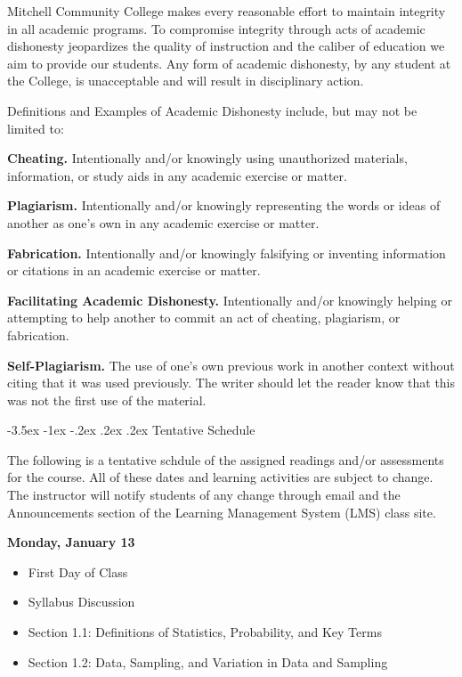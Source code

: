 \documentclass[11pt]{article}
\makeatletter
\renewcommand\section{\@startsection{section}{1}{0pt}%
  {-3.5ex \@plus -1ex \@minus -.2ex}%
  {.2ex \@plus.2ex}%
  {\normalfont\Large\bfseries}} %
\makeatother
\begin{document}
Mitchell Community College makes every reasonable effort to maintain integrity in all academic programs. To compromise integrity through acts of academic dishonesty jeopardizes the quality of instruction and the caliber of education we aim to provide our students.  Any form of academic dishonesty, by any student at the College, is unacceptable and will result in disciplinary action.

Definitions and Examples of Academic Dishonesty include, but may not be limited to:

\textbf{Cheating.} Intentionally and/or knowingly using unauthorized materials, information, or study aids in any academic exercise or matter.

\textbf{Plagiarism.} Intentionally and/or knowingly representing the words or ideas of another as one's own in any academic exercise or matter.

\textbf{Fabrication.} Intentionally and/or knowingly falsifying or inventing information or citations in an academic exercise or matter.

\textbf{Facilitating Academic Dishonesty.} Intentionally and/or knowingly helping or attempting to help another to commit an act of cheating, plagiarism, or fabrication.

\textbf{Self-Plagiarism.} The use of one's own previous work in another context without citing that it was used previously. The writer should let the reader know that this was not the first use of the material.

\pagebreak
\section{Tentative Schedule}

The following is a tentative schdule of the assigned readings and/or assessments for the course. All of these dates and learning activities are subject to change. The instructor will notify students of any change through email and the Announcements section of the Learning Management System (LMS) class site.

\textbf{Monday, January 13}

\begin{itemize}
\item First Day of Class
\item Syllabus Discussion
\item Section 1.1: Definitions of Statistics, Probability, and Key Terms
\item Section 1.2: Data, Sampling, and Variation in Data and Sampling
\end{itemize}
\end{document}
